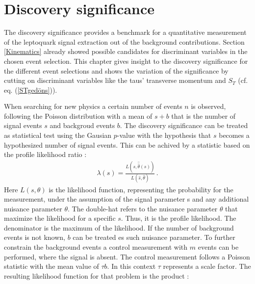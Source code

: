 \section{Discovery significance}\label{significance}
The discovery significance provides a benchmark for a quantitative measurement of the leptoquark signal extraction out of the background contributions. Section \ref{Kinematics} already showed possible candidates for discriminant variables in the chosen event selection. This chapter gives insight to the discovery significance for the different event selections and shows the variation of the significance by cutting on discriminant variables like the taus' transverse momentum and $S_T$ (cf. eq. (\ref{STgedöns})).\par
When searching for new physics a certain number of events $n$ is observed, following the Poisson distribution with a mean of $s+b$ that is the number of signal events $s$ and backgroud events $b$. The discovery significance can be treated as statistical test using the Gausian $p$-value with the hypothesis that $s$ becomes a hypothesized number of signal events. This can be achived by a statistic based on the profile likelihood ratio \cite{AsimovSignificance}:
\begin{align}
                \lambda(s)=\frac{L\left(s,\hat{\hat{\theta}}(s)\right)}{L\left(\hat{s},\hat{\theta}\right)}\,\text{.}
\label{profilelikelihoodratio}
\end{align}
Here $L(s,\theta)$ is the likelihood function, representing the probability for the measurement, under the assumption of the signal parameter s and any additional nuisance parameter $\theta$. The double-hat refers to the nuisance parameter $\theta$ that maximize the likelihood for a specific $s$. Thus, it is the profile likelihood. The denominator is the maximum of the likelihood. \cite{AsimovSignificance}\newline
If the number of background events is not known, $b$ can be treated es such nuisance parameter. To further constrain the background events a control measurement with $m$ events can be performed, where the signal is absent. The control measurement follows a Poisson statistic with the mean value of $\tau b$. In this context $\tau$ represents a scale factor. The resulting likelihood function for that problem is the product \cite{AsimovSignificance}:
